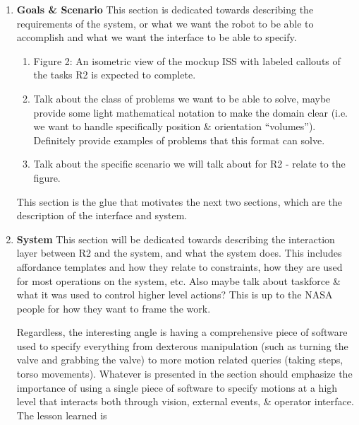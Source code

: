 \begin{enumerate}
\begin{enumerate}
  \end{enumerate}
\item \textbf{Goals \& Scenario}
  This section is dedicated towards describing the requirements of the system, or what we want the robot to be able to accomplish and what we want the interface to be able to specify.
  \begin{enumerate}
  \item
    Figure 2: An isometric view of the mockup ISS with labeled callouts of the tasks R2 is expected to complete.
  \item
    Talk about the class of problems we want to be able to solve, maybe provide some light mathematical notation to make the domain clear (i.e. we want to handle specifically position \& orientation ``volumes'').
    Definitely provide examples of problems that this format can solve.
  \item
    Talk about the specific scenario we will talk about for R2 - relate to the figure.
  \end{enumerate}

  This section is the glue that motivates the next two sections, which are the description of the interface and system.
  
\item \textbf{System}
  This section will be dedicated towards describing the interaction layer between R2 and the system, and what the system does.
  This includes affordance templates and how they relate to constraints, how they are used for most operations on the system, etc.
  Also maybe talk about taskforce \& what it was used to control higher level actions?
  This is up to the NASA people for how they want to frame the work.

  Regardless, the interesting angle is having a comprehensive piece of software used to specify everything from dexterous manipulation (such as turning the valve and grabbing the valve) to more motion related queries (taking steps, torso movements).
  Whatever is presented in the section should emphasize the importance of using a single piece of software to specify motions at a high level that interacts both through vision, external events, \& operator interface.
  The lesson learned is 


\end{enumerate}
